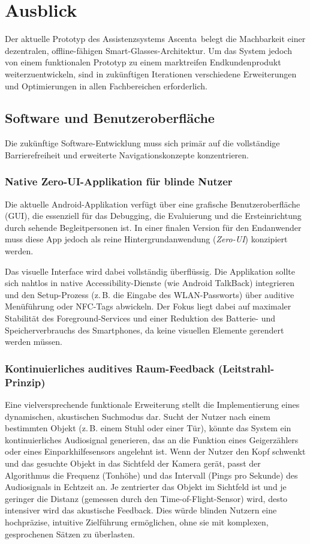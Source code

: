 \chapter{Ausblick}
Der aktuelle Prototyp des Assistenzsystems \glqq Ascenta\grqq\ belegt die Machbarkeit einer dezentralen, offline-fähigen Smart-Glasses-Architektur. Um das System jedoch von einem funktionalen Prototyp zu einem marktreifen Endkundenprodukt weiterzuentwickeln, sind in zukünftigen Iterationen verschiedene Erweiterungen und Optimierungen in allen Fachbereichen erforderlich.

\section{Software und Benutzeroberfläche}
Die zukünftige Software-Entwicklung muss sich primär auf die vollständige Barrierefreiheit und erweiterte Navigationskonzepte konzentrieren.

\subsection{Native Zero-UI-Applikation für blinde Nutzer}
Die aktuelle Android-Applikation verfügt über eine grafische Benutzeroberfläche (GUI), die essenziell für das Debugging, die Evaluierung und die Ersteinrichtung durch sehende Begleitpersonen ist. In einer finalen Version für den Endanwender muss diese App jedoch als reine Hintergrundanwendung (\textit{Zero-UI}) konzipiert werden. 

Das visuelle Interface wird dabei vollständig überflüssig. Die Applikation sollte sich nahtlos in native Accessibility-Dienste (wie Android TalkBack) integrieren und den Setup-Prozess (z.\,B. die Eingabe des WLAN-Passworts) über auditive Menüführung oder NFC-Tags abwickeln. Der Fokus liegt dabei auf maximaler Stabilität des Foreground-Services und einer Reduktion des Batterie- und Speicherverbrauchs des Smartphones, da keine visuellen Elemente gerendert werden müssen.

\subsection{Kontinuierliches auditives Raum-Feedback (Leitstrahl-Prinzip)}
Eine vielversprechende funktionale Erweiterung stellt die Implementierung eines dynamischen, akustischen Suchmodus dar. Sucht der Nutzer nach einem bestimmten Objekt (z.\,B. einem Stuhl oder einer Tür), könnte das System ein kontinuierliches Audiosignal generieren, das an die Funktion eines Geigerzählers oder eines Einparkhilfesensors angelehnt ist. Wenn der Nutzer den Kopf schwenkt und das gesuchte Objekt in das Sichtfeld der Kamera gerät, passt der Algorithmus die Frequenz (Tonhöhe) und das Intervall (Pings pro Sekunde) des Audiosignals in Echtzeit an. Je zentrierter das Objekt im Sichtfeld ist und je geringer die Distanz (gemessen durch den Time-of-Flight-Sensor) wird, desto intensiver wird das akustische Feedback. Dies würde blinden Nutzern eine hochpräzise, intuitive Zielführung ermöglichen, ohne sie mit komplexen, gesprochenen Sätzen zu überlasten.

